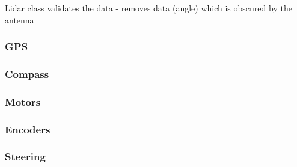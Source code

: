 Lidar class validates the data
 - removes data (angle) which is obscured by the antenna


\subsubsection{GPS}

\subsubsection{Compass}

\subsubsection{Motors}

\subsubsection{Encoders}

\subsubsection{Steering}
